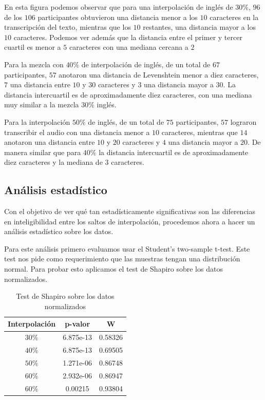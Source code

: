 En esta figura podemos observar que para una interpolación de inglés de $30\%$, $96$ de los $106$ participantes obtuvieron una distancia menor a los $10$ caracteres en la transcripción del texto, mientras que los $10$ restantes, una distancia mayor a los $10$ caracteres. Podemos ver además que la distancia entre el primer y tercer cuartil es menor a $5$ caracteres con una mediana cercana a $2$ 

Para la mezcla con $40\%$ de interpolación de inglés, de un total de $67$ participantes, $57$ anotaron una distancia de Levenshtein menor a diez caracteres, $7$ una distancia entre $10$ y $30$ caracteres y $3$ una distancia mayor a $30$. La distancia intercuartil es de aproximadamente diez caracteres, con una mediana muy similar a la mezcla $30\%$ inglés.

Para la interpolación $50\%$ de inglés, de un total de $75$ participantes, $57$ lograron transcribir el audio con una distancia menor a $10$ caracteres, mientras que $14$ anotaron una distancia entre $10$ y $20$ caracteres y $4$ una distancia mayor a $20$. De manera similar que para $40\%$ la distancia intercuartil es de aproximadamente diez caracteres y la mediana de $3$ caracteres.

\subsection{Análisis estadístico}
Con el objetivo de ver qué tan estadísticamente significativas son las diferencias en inteligibilidad entre los saltos de interpolación, procedemos ahora a hacer un análisis estadístico sobre los datos. 

Para este análisis primero evaluamos usar el Student's two-sample t-test. Este test nos pide como requerimiento que las muestras tengan una distribución normal. Para probar esto aplicamos el test de Shapiro sobre los datos normalizados.

\begin{table}
\begin{tabular}[t]{| c | c | c |}
\hline
Interpolación & p-valor & W \\
\hline
\hline
$30\%$ & 6.875e-13 & 0.58326 \\
\hline
$40\%$ & 6.875e-13 & 0.69505 \\
\hline
$50\%$ & 1.271e-06 & 0.86748 \\
\hline
$60\%$ & 2.932e-06 & 0.86947 \\
\hline
$60\%$ & 0.00215 & 0.93804\\

\hline
\end{tabular}
\caption{Test de Shapiro sobre los datos normalizados} 
\label{fig:resultadosShapiro}
\end{table}

